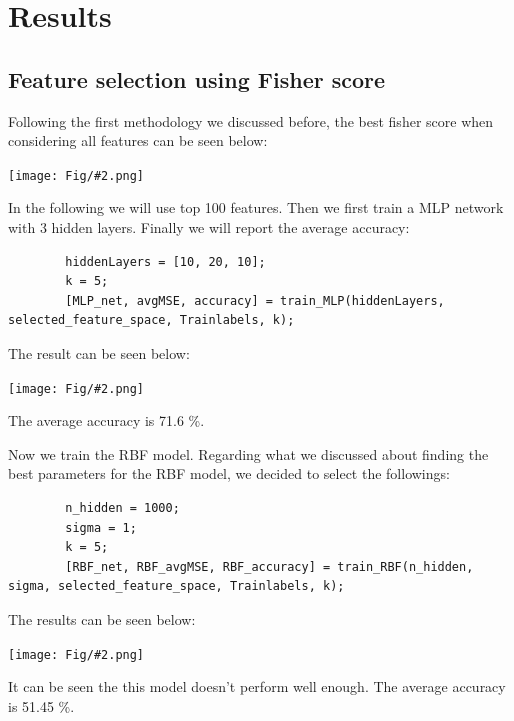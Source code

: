 \documentclass[]{article}
\newcommand{\pict}[2]{\begin{center}
		\texttt{[image: Fig/\#2.png]}
\end{center}}
\begin{document}
	\section{Results}
	\subsection{Feature selection using Fisher score}
	Following the first methodology we discussed before, the best fisher score when considering all features can be seen below:
	\pict{1}{F5}
	In the following we will use top 100 features. Then we first train a MLP network with 3 hidden layers. Finally we will report the average accuracy:
	\begin{lstlisting}
		hiddenLayers = [10, 20, 10];
		k = 5;
		[MLP_net, avgMSE, accuracy] = train_MLP(hiddenLayers, selected_feature_space, Trainlabels, k);
	\end{lstlisting}
	The result can be seen below:
	\pict{0.6}{F6}
	The average accuracy is 71.6 \%.
	
	Now we train the RBF model. Regarding what we discussed about finding the best parameters for the RBF model, we decided to select the followings:
	\begin{lstlisting}
		n_hidden = 1000;
		sigma = 1;
		k = 5;
		[RBF_net, RBF_avgMSE, RBF_accuracy] = train_RBF(n_hidden, sigma, selected_feature_space, Trainlabels, k);
	\end{lstlisting}
	The results can be seen below:
	\pict{0.6}{F7}
	It can be seen the this model doesn't perform well enough. The average accuracy is 51.45 \%.
	
	
\end{document}
